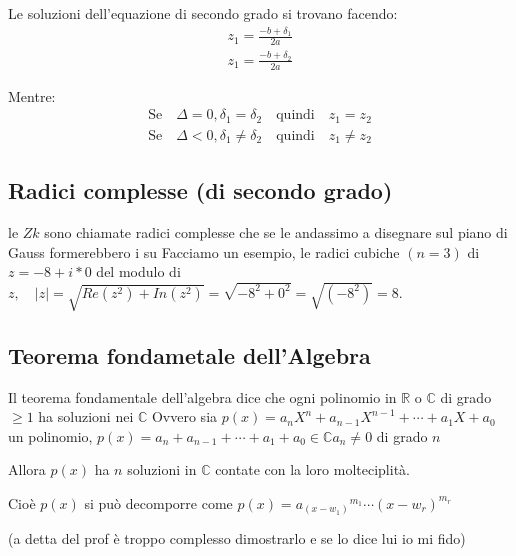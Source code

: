 \documentclass{article}
\theoremstyle{definition}
\begin{document}
Le soluzioni dell'equazione di secondo grado si trovano facendo:
\begin{align}
        z_1 = \frac{-b + \delta_1}{2a} \\
        z_1 = \frac{-b + \delta_2}{2a} 
\end{align}

Mentre:
\begin{align}
        \mbox{Se} \quad \Delta = 0, \delta_1=\delta_2 \quad \mbox{quindi} \quad z_1=z_2 \\
        \mbox{Se} \quad \Delta < 0, \delta_1 \not = \delta_2 \quad \mbox{quindi} \quad z_1 \not = z_2 
\end{align}



\subsection{Radici complesse (di secondo grado)}
le $Zk$ sono chiamate radici complesse che se le andassimo a disegnare sul piano di Gauss formerebbero i su \newline
Facciamo un esempio, le radici cubiche $(n=3)$ di $z = -8 +i*0$ del modulo di $z, \quad|z| = \sqrt{Re(z^2)+In(z^2)} = \sqrt{-8^2 + 0^2} = \sqrt{(-8^2)} = 8$.



\subsection{Teorema fondametale dell'Algebra}
Il teorema fondamentale dell'algebra dice che ogni polinomio in $\mathbb{R}$ o $\mathbb{C}$ di grado $\geq 1$ ha soluzioni nei $\mathbb{C}$ \newline 
Ovvero sia $p(x) = a_n X^n + a_{n-1} X^{n-1} + \cdots + a_1 X + a_0$ un polinomio, $p(x) = a_n  + a_{n-1} + \cdots + a_1 + a_0 \in \mathbb{C} a_n \not = 0$ di grado $n$ \par
Allora $p(x)$ ha $n$ soluzioni in $\mathbb{C}$ contate con la loro molteciplità.\par
Cioè $p(x)$ si può decomporre come $p(x) = {a_(x-w_1)}^{m_1} \cdots {(x-w_r)}^{m_r}$ \newline

(a detta del prof è troppo complesso dimostrarlo e se lo dice lui io mi fido)







\newpage
\end{document}
